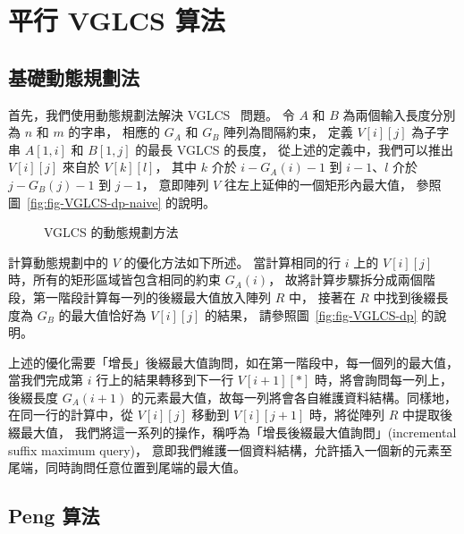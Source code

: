 \section{平行 VGLCS 算法} \label{sec:parallelVGLCS}

\subsection{基礎動態規劃法}

首先，我們使用動態規劃法解決 VGLCS~\cite{Peng2011TheLC} 問題。
令 $A$ 和 $B$ 為兩個輸入長度分別為 $n$ 和 $m$ 的字串，
相應的 $G_A$ 和 $G_B$ 陣列為間隔約束，
定義 $V[i][j]$ 為子字串 $A[1, i]$ 和 $B[1, j]$ 的最長 VGLCS 的長度，
從上述的定義中，我們可以推出 $V[i][j]$ 來自於 $V[k][l]$，
其中 $k$ 介於 $i-G_A(i)-1$ 到 $i-1$、$l$ 介於 $j-G_B(j)-1$ 到 $j-1$，
意即陣列 $V$ 往左上延伸的一個矩形內最大值，
參照圖~\ref{fig:fig-VGLCS-dp-naive} 的說明。

\begin{figure}[!thb]
  \centering {} 
  \caption{VGLCS 的動態規劃方法}
  \label{fig:basic-dp-VGLCS}
\end{figure}

計算動態規劃中的 $V$ 的優化方法如下所述。
當計算相同的行 $i$ 上的 $V[i][j]$ 時，所有的矩形區域皆包含相同的約束 $G_A(i)$，
故將計算步驟拆分成兩個階段，第一階段計算每一列的後綴最大值放入陣列 $R$ 中，
接著在 $R$ 中找到後綴長度為 $G_B$ 的最大值恰好為 $V[i][j]$ 的結果，
請參照圖~\ref{fig:fig-VGLCS-dp} 的說明。

上述的優化需要「增長」後綴最大值詢問，如在第一階段中，每一個列的最大值，
當我們完成第 $i$ 行上的結果轉移到下一行 $V[i+1][*]$ 時，將會詢問每一列上，
後綴長度 $G_A(i+1)$ 的元素最大值，故每一列將會各自維護資料結構。同樣地，
在同一行的計算中，從 $V[i][j]$ 移動到 $V[i][j+1]$ 時，將從陣列 $R$ 中提取後綴最大值，
我們將這一系列的操作，稱呼為「增長後綴最大值詢問」(incremental suffix maximum query)，
意即我們維護一個資料結構，允許插入一個新的元素至尾端，同時詢問任意位置到尾端的最大值。


\subsection{Peng 算法}

